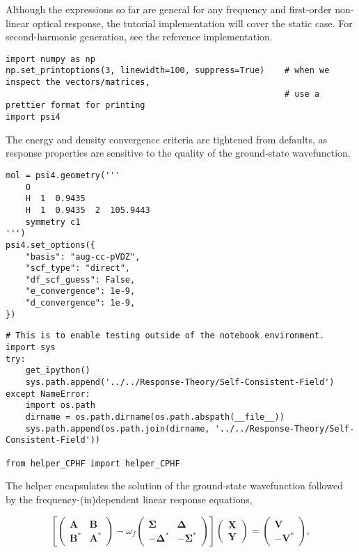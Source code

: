 \documentclass[]{article}
\begin{document}
Although the expressions so far are general for any frequency and
first-order non-linear optical response, the tutorial implementation
will cover the static case. For second-harmonic generation, see the
reference implementation.

\begin{verbatim}
import numpy as np
np.set_printoptions(3, linewidth=100, suppress=True)    # when we inspect the vectors/matrices,
                                                        # use a prettier format for printing
import psi4
\end{verbatim}

The energy and density convergence criteria are tightened from defaults,
as response properties are sensitive to the quality of the ground-state
wavefunction.

\begin{verbatim}
mol = psi4.geometry('''
    O
    H  1  0.9435
    H  1  0.9435  2  105.9443
    symmetry c1
''')
psi4.set_options({
    "basis": "aug-cc-pVDZ",
    "scf_type": "direct",
    "df_scf_guess": False,
    "e_convergence": 1e-9,
    "d_convergence": 1e-9,
})
\end{verbatim}

\begin{verbatim}
# This is to enable testing outside of the notebook environment.
import sys
try:
    get_ipython()
    sys.path.append('../../Response-Theory/Self-Consistent-Field')
except NameError:
    import os.path
    dirname = os.path.dirname(os.path.abspath(__file__))
    sys.path.append(os.path.join(dirname, '../../Response-Theory/Self-Consistent-Field'))

from helper_CPHF import helper_CPHF
\end{verbatim}

The helper encapsulates the solution of the ground-state wavefunction
followed by the frequency-(in)dependent linear response equations,

\[
\left[
\begin{pmatrix}
\mathbf{A} & \mathbf{B} \\
\mathbf{B}^{*} & \mathbf{A}^{*}
\end{pmatrix}
- \omega_{f}
\begin{pmatrix}
\mathbf{\Sigma} & \mathbf{\Delta} \\
-\mathbf{\Delta}^{*} & -\mathbf{\Sigma}^{*}
\end{pmatrix}
\right]
\begin{pmatrix}
\mathbf{X} \\
\mathbf{Y}
\end{pmatrix}
=
\begin{pmatrix}
\mathbf{V} \\
-\mathbf{V}^{*}
\end{pmatrix}
,
\]
\end{document}
